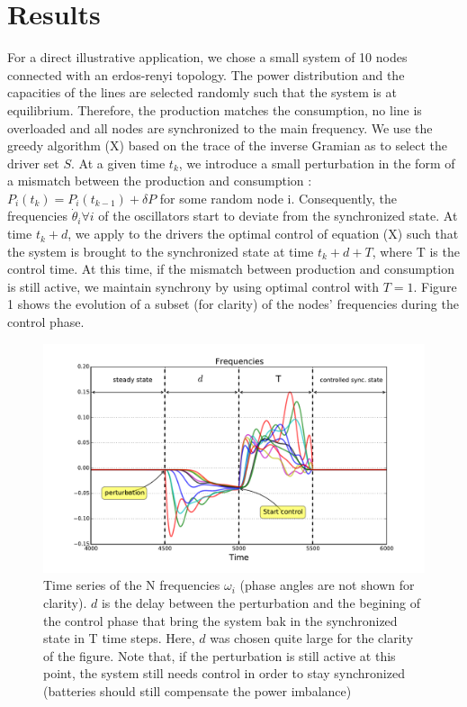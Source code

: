 \documentclass[conference]{IEEEtran}
\begin{document}
\section{Results}
\label{sec:Results}

For a direct illustrative application, we chose a small system of 10 nodes connected with an erdos-renyi topology. The power distribution and the capacities of the lines are selected randomly such that the system is at equilibrium. Therefore, the production matches the consumption, no line is overloaded and all nodes are synchronized to the main frequency. We use the greedy algorithm (X) based on the trace of the inverse Gramian as to select the driver set $S$. At a given time $ t_k $, we introduce a small perturbation in the form of a mismatch between the production and consumption : $P_i(t_k) = P_i(t_{k-1}) + \delta P$ for some random node i. Consequently, the frequencies $ \dot{ \theta }_i \forall i $ of the oscillators start to deviate from the synchronized state. At time $ t_k + d $, we apply to the drivers the optimal control of equation (X) such that the system is brought to the synchronized state at time $ t_k + d + T $, where T is the control time. At this time, if the mismatch between production and consumption is still active, we maintain synchrony by using optimal control with $T=1$. Figure 1 shows the evolution of a subset (for clarity) of the nodes' frequencies during the control phase.

\begin{figure}
\label{fig:frequecies}
\includegraphics[scale=.38]{frequencies}
\caption{Time series of the N frequencies $\omega_i$ (phase angles are not shown for clarity). $d$ is the delay between the perturbation and the begining of the control phase that bring the system bak in the synchronized state in T time steps. Here, $d$ was chosen quite large for the clarity of the figure. Note that, if the perturbation is still active at this point, the system still needs control in order to stay synchronized (batteries should still compensate the power imbalance)}
\end{figure}
\end{document}
